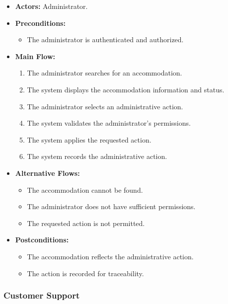 \begin{itemize}
    \item \textbf{Actors:} Administrator.
    
    \item \textbf{Preconditions:}
    \begin{itemize}
        \item The administrator is authenticated and authorized.
    \end{itemize}
    
    \item \textbf{Main Flow:}
    \begin{enumerate}
        \item The administrator searches for an accommodation.
        \item The system displays the accommodation information and status.
        \item The administrator selects an administrative action.
        \item The system validates the administrator's permissions.
        \item The system applies the requested action.
        \item The system records the administrative action.
    \end{enumerate}
    
    \item \textbf{Alternative Flows:}
    \begin{itemize}
        \item The accommodation cannot be found.
        \item The administrator does not have sufficient permissions.
        \item The requested action is not permitted.
    \end{itemize}
    
    \item \textbf{Postconditions:}
    \begin{itemize}
        \item The accommodation reflects the administrative action.
        \item The action is recorded for traceability.
    \end{itemize}
\end{itemize}


\subsubsection{Customer Support}

